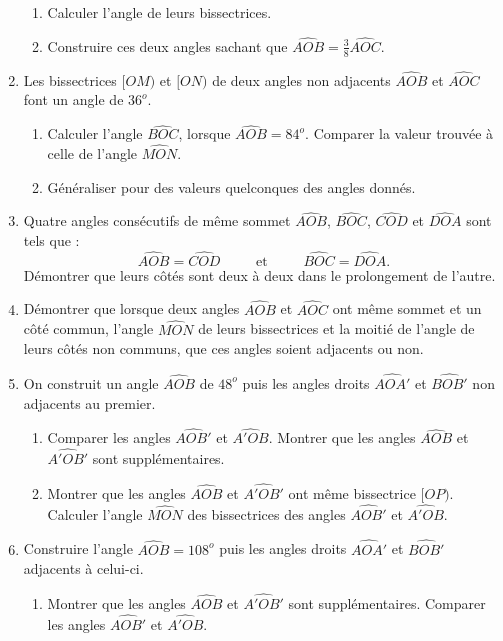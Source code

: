 \documentclass[12 pt]{report}
\theoremstyle{plain}
\newcounter{n}
\begin{document}
\begin{enumerate}
\begin{enumerate}
\item Calculer l'angle de leurs bissectrices. 
\item Construire ces deux angles sachant que $\widehat{AOB}= \frac38\widehat{AOC}$.
\end{enumerate}
\item Les bissectrices $[OM)$ et $[ON)$ de deux angles non adjacents $\widehat{AOB}$ et $\widehat{AOC}$ font un angle de $36^o$. \begin{enumerate}
\item Calculer l'angle $\widehat{BOC}$, lorsque $\widehat{AOB}= 84^o$. Comparer la valeur trouvée à celle de l'angle $\widehat{MON}$. 
\item Généraliser pour des valeurs quelconques des angles donnés. 
\end{enumerate}
\item Quatre angles consécutifs de même sommet $\widehat{AOB}$, $\widehat{BOC}$, 
$\widehat{COD}$ et $\widehat{DOA}$ sont tels que : \[ \widehat{AOB}= \widehat{COD}
\phantom{meow}\text{et}\phantom{meow}\widehat{BOC}=\widehat{DOA}.\]
Démontrer que leurs côtés sont deux à deux dans le prolongement de l'autre. 
\item Démontrer que lorsque deux angles $\widehat{AOB}$ et $\widehat{AOC}$ ont même sommet et un côté commun, l'angle $\widehat{MON}$ de leurs bissectrices et la moitié de l'angle de leurs côtés non communs, que ces angles soient adjacents ou non. 
\item On construit un angle $\widehat{AOB}$ de $48^o$ puis les angles droits $\widehat{AOA'}$ et $\widehat{BOB'}$ non adjacents au premier. 
\begin{enumerate}
\item Comparer les angles $\widehat{AOB'}$ et $\widehat{A'OB}$. Montrer que les angles $\widehat{AOB}$ et $\widehat{A'OB'}$ sont supplémentaires. 
\item Montrer que les angles $\widehat{AOB}$ et $\widehat{A'OB'}$ ont même bissectrice $[OP)$. Calculer l'angle $\widehat{MON}$ des bissectrices des angles $\widehat{AOB'}$ et $\widehat{A'OB}$. 
\end{enumerate}
\item Construire l'angle $\widehat{AOB}=108^o$ puis les angles droits $\widehat{AOA'}$ et $\widehat{BOB'}$ adjacents à celui-ci. 
\begin{enumerate}
\item Montrer que les angles $\widehat{AOB}$ et $\widehat{A'OB'}$ sont supplémentaires. Comparer les angles $\widehat{AOB'}$ et $\widehat{A'OB}$. 

\end{enumerate}
\end{enumerate}
\end{document}

